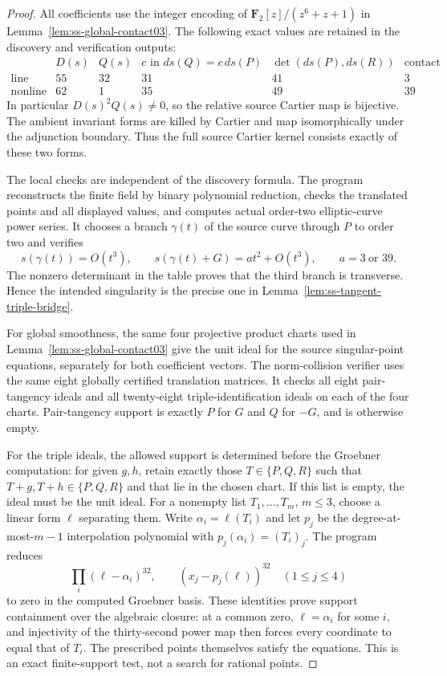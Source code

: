 \begin{proof}
All coefficients use the integer encoding of
$\mathbf F_2[z]/(z^6+z+1)$ in
Lemma~\ref{lem:ss-global-contact03}. The following exact values
are retained in the discovery and verification outputs:
\[
\begin{array}{c|ccccc}
 &D(s)&Q(s)&c\text{ in }ds(Q)=c\,ds(P)
 &\det(ds(P),ds(R))&\text{contact coefficient}\\\hline
 \mathrm{line}&55&32&31&41&3\\
 \mathrm{nonline}&62&1&35&49&39
\end{array}
\]
In particular $D(s)^2Q(s)\ne0$, so the relative source Cartier map
is bijective. The ambient invariant forms are killed by Cartier and
map isomorphically under the adjunction boundary. Thus the full source
Cartier kernel consists exactly of these two forms.

The local checks are independent of the discovery formula.
The program 
reconstructs the finite field by binary polynomial reduction,
checks the translated points and all displayed values, and computes
actual order-two elliptic-curve power series. It chooses a branch
$\gamma(t)$ of the source curve through $P$ to order two and verifies
\[
 s(\gamma(t))=O(t^3),\qquad
 s(\gamma(t)+G)=a t^2+O(t^3),
 \qquad a=3\ \text{or }39.
\]
The nonzero determinant in the table proves that the third branch
is transverse. Hence the intended singularity is the precise
one in Lemma~\ref{lem:ss-tangent-triple-bridge}.

For global smoothness, the same four projective product charts used
in Lemma~\ref{lem:ss-global-contact03} give the unit ideal for the
source singular-point equations, separately for both coefficient
vectors. The norm-collision verifier uses the same eight globally
certified translation matrices. It checks all eight pair-tangency
ideals and all twenty-eight triple-identification ideals on each of
the four charts. Pair-tangency support is exactly $P$ for $G$ and
$Q$ for $-G$, and is otherwise empty.

For the triple ideals, the allowed support is determined before the
Groebner computation: for given $g,h$, retain exactly those
$T\in\{P,Q,R\}$ such that $T+g,T+h\in\{P,Q,R\}$ and that lie
in the chosen chart. If this list is empty, the ideal must be the
unit ideal. For a nonempty list $T_1,\ldots,T_m$, $m\le3$, choose
a linear form $\ell$ separating them. Write $\alpha_i=\ell(T_i)$
and let $p_j$ be the degree-at-most-$m-1$ interpolation polynomial
with $p_j(\alpha_i)=(T_i)_j$. The program reduces
\[
  \prod_i(\ell-\alpha_i)^{32},\qquad
          (x_j-p_j(\ell))^{32}\quad(1\le j\le4)
\]
to zero in the computed Groebner basis. These identities prove
support containment over the algebraic closure: at a common zero,
$\ell=\alpha_i$ for some $i$, and injectivity of the thirty-second
power map then forces every coordinate to equal that of $T_i$.
The prescribed points themselves satisfy the equations. This is
an exact finite-support test, not a search for rational points.


\end{proof}

